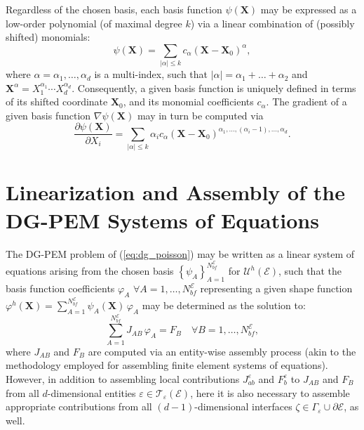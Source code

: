 		Regardless of the chosen basis, each basis function $\psi (\mathbf{X})$ may be expressed as a low-order polynomial (of maximal degree $k$) via a linear combination of (possibly shifted) monomials:
		\begin{equation}
			\psi (\mathbf{X}) = \sum_{|\alpha| \leq k} c_\alpha (\mathbf{X}-\mathbf{X}_0)^{\alpha},
		\end{equation}
		where $\alpha = \alpha_1, \ldots, \alpha_d$ is a multi-index, such that $|\alpha| = \alpha_1 + \ldots + \alpha_2$ and $\mathbf{X}^\alpha = X_1^{\alpha_1} \cdots X_d^{\alpha_d}$. Consequently, a given basis function is uniquely defined in terms of its shifted coordinate $\mathbf{X}_0$, and its monomial coefficients $c_\alpha$. The gradient of a given basis function $\nabla \psi (\mathbf{X})$ may in turn be computed via
		\begin{equation}
			\frac{\partial \psi (\mathbf{X})}{\partial X_i} = \sum_{|\alpha| \leq k} \alpha_i c_\alpha (\mathbf{X}-\mathbf{X}_0)^{\alpha_1, \ldots, (\alpha_i - 1), \ldots, \alpha_d}.
		\end{equation}
		
\section{Linearization and Assembly of the \\ DG-PEM Systems of Equations}

	The DG-PEM problem of (\ref{eq:dg_poisson}) may be written as a linear system of equations arising from the chosen basis $\left\{ \psi_A \right\}_{A=1}^{N^\mathcal{E}_{bf}}$ for $\mathcal{U}^h (\mathcal{E})$, such that the basis function coefficients $\varphi_A \, \, \forall A = 1, \ldots, N^\mathcal{E}_{bf}$ representing a given shape function $\varphi^h (\mathbf{X}) = \sum_{A=1}^{N^\mathcal{E}_{bf}} \psi_A (\mathbf{X}) \, \varphi_A$ may be determined as the solution to:
	\begin{equation}
		\sum_{A=1}^{N^\mathcal{E}_{bf}} J_{AB} \, \varphi_A = F_B \quad \forall B = 1, \ldots, N^\mathcal{E}_{bf},
		\label{eq:linearization_dgpem}
	\end{equation}
	where $J_{AB}$ and $F_B$ are computed via an entity-wise assembly process (akin to the methodology employed for assembling finite element systems of equations). However, in addition to assembling local contributions $J^\varepsilon_{ab}$ and $F^\varepsilon_b$ to $J_{AB}$ and $F_B$ from all $d$-dimensional entities $\varepsilon \in \mathcal{T}_\varepsilon (\mathcal{E})$, here it is also necessary to assemble appropriate contributions from all $(d-1)$-dimensional interfaces $\zeta \in \Gamma_\varepsilon \cup \partial \mathcal{E}$, as well.

